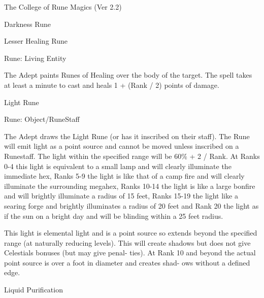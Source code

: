 \begin{Chapter}{The College of Rune Magics (Ver 2.2)}
\begin{spell}[G-2]{Darkness Rune }
\begin{effects}
\end{effects}
\end{spell}

\begin{spell}[G-3]{Lesser Healing Rune }

Rune: Living Entity 
\begin{effects}
 The  Adept  paints  Runes  of  Healing  over 
the  body  of  the  target.  The  spell  takes  at  least  a 
minute  to  cast  and  heals  1  +  (Rank  /  2)  points  of 
damage. 

\end{effects}
\end{spell}

\begin{spell}[G-4]{Light Rune }

Rune: Object/RuneStaff 
\begin{effects}
The Adept draws the Light Rune (or has it 
inscribed  on  their  staff).  The  Rune  will  emit  light 
as  a  point  source  and  cannot  be  moved  unless 
inscribed  on  a  Runestaff.  The  light  within  the 
specified range will be 60\% + 2 / Rank. At Ranks 
0-4 this light is equivalent to a small lamp and will 
clearly  illuminate  the  immediate  hex,  Ranks  5-9 
the light is like that of a camp fire and will clearly 
illuminate  the  surrounding  megahex,  Ranks  10-14 
the  light  is  like  a  large  bonfire  and  will  brightly 
illuminate a radius of 15 feet, Ranks 15-19 the light 
like  a  searing  forge  and  brightly  illuminates  a 
radius of 20 feet and Rank 20 the light as if the sun 
on  a  bright  day  and  will  be  blinding  within  a  25 
feet radius. 

This light is elemental light and is a point source so 
extends  beyond  the  specified  range  (at  naturally 
reducing levels). This will create shadows but does 
not  give  Celestials  bonuses  (but  may  give  penal-
ties).  At  Rank  10  and  beyond  the  actual  point 
source is over a foot in diameter and creates shad-
ows without a defined edge. 

\end{effects}
\end{spell}

\begin{spell}[G-5]{Liquid Purification }


\end{spell}
\end{Chapter}
